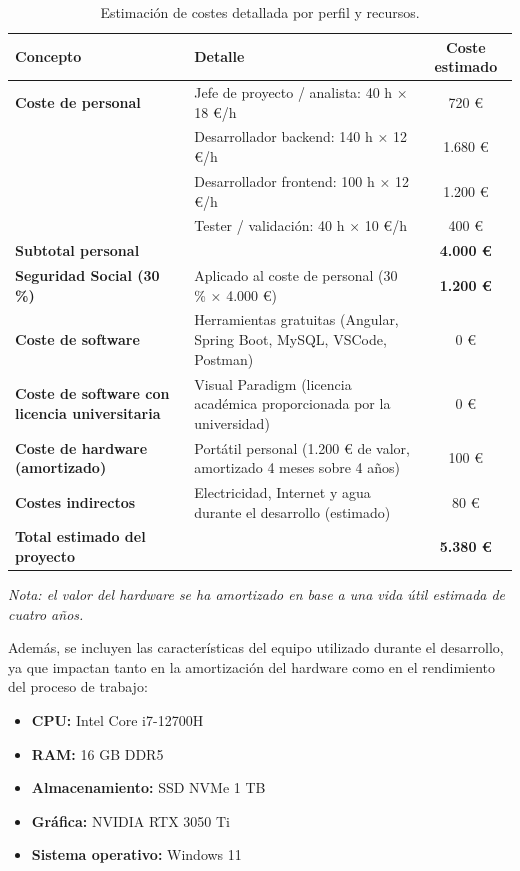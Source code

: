 \begin{table}[H]
\centering
\begin{tabular}{|L{4.5cm}|L{7.5cm}|c|}
\hline
\textbf{Concepto} & \textbf{Detalle} & \textbf{Coste estimado} \\
\hline
\textbf{Coste de personal} & Jefe de proyecto / analista: 40 h × 18 €/h & 720 € \\
 & Desarrollador backend: 140 h × 12 €/h & 1.680 € \\
 & Desarrollador frontend: 100 h × 12 €/h & 1.200 € \\
 & Tester / validación: 40 h × 10 €/h & 400 € \\
\hline
\textbf{Subtotal personal} & & \textbf{4.000 €} \\
\hline
\textbf{Seguridad Social (30 \%)} & Aplicado al coste de personal (30 \% × 4.000 €) & \textbf{1.200 €} \\
\hline
\textbf{Coste de software} & Herramientas gratuitas (Angular, Spring Boot, MySQL, VSCode, Postman) & 0 € \\
\hline
\textbf{Coste de software con licencia universitaria} & Visual Paradigm (licencia académica proporcionada por la universidad) & 0 € \\
\hline
\textbf{Coste de hardware (amortizado)} & Portátil personal (1.200 € de valor, amortizado 4 meses sobre 4 años) & 100 € \\
\hline
\textbf{Costes indirectos} & Electricidad, Internet y agua durante el desarrollo (estimado) & 80 € \\
\hline
\textbf{Total estimado del proyecto} & & \textbf{5.380 €} \\
\hline
\end{tabular}
\caption{Estimación de costes detallada por perfil y recursos.}
\vspace{0.3cm}
\textit{Nota: el valor del hardware se ha amortizado en base a una vida útil estimada de cuatro años.}
\end{table}
\clearpage
Además, se incluyen las características del equipo utilizado durante el desarrollo, ya que impactan tanto en la amortización del hardware como en el rendimiento del proceso de trabajo:

\begin{itemize}
    \item \textbf{CPU:} Intel Core i7-12700H
    \item \textbf{RAM:} 16 GB DDR5
    \item \textbf{Almacenamiento:} SSD NVMe 1 TB
    \item \textbf{Gráfica:} NVIDIA RTX 3050 Ti
    \item \textbf{Sistema operativo:} Windows 11
\end{itemize}

